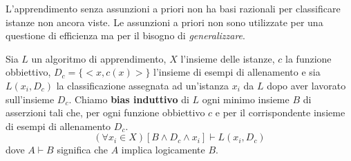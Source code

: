 L'apprendimento senza assunzioni a priori non ha basi razionali per classificare istanze non ancora viste. Le assunzioni
a priori non sono utilizzate per una questione di efficienza ma per il bisogno di \emph{generalizzare}.

\begin{definition}
	Sia $L$ un algoritmo di apprendimento, $X$ l'insieme delle istanze, $c$ la funzione obbiettivo, $D_c = \{<x, c(x)>\}$
	l'insieme di esempi di allenamento e sia $L(x_i, D_c)$ la classificazione assegnata ad un'istanza $x_i$ da $L$ dopo
	aver lavorato sull'insieme $D_c$. Chiamo \textbf{bias induttivo} di $L$ ogni minimo insieme $B$ di asserzioni tali che,
	per ogni funzione obbiettivo $c$ e per il corrispondente insieme di esempi di allenamento $D_c$.
	\[ (\forall x_i \in X) [B \wedge D_c \wedge x_i] \vdash L(x_i, D_c) \]
	dove $A \vdash B$ significa che $A$ implica logicamente $B$.
\end{definition}